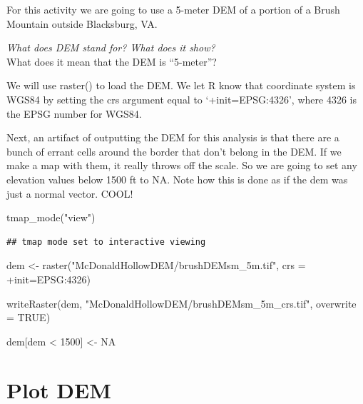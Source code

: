 \documentclass[
]{book}
\newenvironment{Shaded}{\begin{snugshade}}{\end{snugshade}}
\newcommand{\AttributeTok}[1]{\textcolor[rgb]{0.77,0.63,0.00}{#1}}
\newcommand{\ConstantTok}[1]{\textcolor[rgb]{0.00,0.00,0.00}{#1}}
\newcommand{\DecValTok}[1]{\textcolor[rgb]{0.00,0.00,0.81}{#1}}
\newcommand{\FunctionTok}[1]{\textcolor[rgb]{0.00,0.00,0.00}{#1}}
\newcommand{\NormalTok}[1]{#1}
\newcommand{\OtherTok}[1]{\textcolor[rgb]{0.56,0.35,0.01}{#1}}
\newcommand{\SpecialCharTok}[1]{\textcolor[rgb]{0.00,0.00,0.00}{#1}}
\newcommand{\StringTok}[1]{\textcolor[rgb]{0.31,0.60,0.02}{#1}}
\begin{document}
For this activity we are going to use a 5-meter DEM of a portion of a Brush Mountain outside Blacksburg, VA.

\emph{What does DEM stand for? What does it show?\\
}What does it mean that the DEM is ``5-meter''?

We will use raster() to load the DEM. We let R know that coordinate system is WGS84 by setting the crs argument equal to `+init=EPSG:4326', where 4326 is the EPSG number for WGS84.

Next, an artifact of outputting the DEM for this analysis is that there are a bunch of errant cells around the border that don't belong in the DEM. If we make a map with them, it really throws off the scale. So we are going to set any elevation values below 1500 ft to NA. Note how this is done as if the dem was just a normal vector. COOL!

\begin{Shaded}
\begin{Highlighting}[]
\FunctionTok{tmap\_mode}\NormalTok{(}\StringTok{"view"}\NormalTok{)}
\end{Highlighting}
\end{Shaded}

\begin{verbatim}
## tmap mode set to interactive viewing
\end{verbatim}

\begin{Shaded}
\begin{Highlighting}[]
\NormalTok{dem }\OtherTok{\textless{}{-}} \FunctionTok{raster}\NormalTok{(}\StringTok{"McDonaldHollowDEM/brushDEMsm\_5m.tif"}\NormalTok{, }\AttributeTok{crs =} \StringTok{\textquotesingle{}+init=EPSG:4326\textquotesingle{}}\NormalTok{)}

\FunctionTok{writeRaster}\NormalTok{(dem, }\StringTok{"McDonaldHollowDEM/brushDEMsm\_5m\_crs.tif"}\NormalTok{, }\AttributeTok{overwrite =} \ConstantTok{TRUE}\NormalTok{) }

\NormalTok{dem[dem }\SpecialCharTok{\textless{}} \DecValTok{1500}\NormalTok{] }\OtherTok{\textless{}{-}} \ConstantTok{NA}
\end{Highlighting}
\end{Shaded}

\hypertarget{plot-dem}{%
\section{Plot DEM}\label{plot-dem}}
\end{document}
